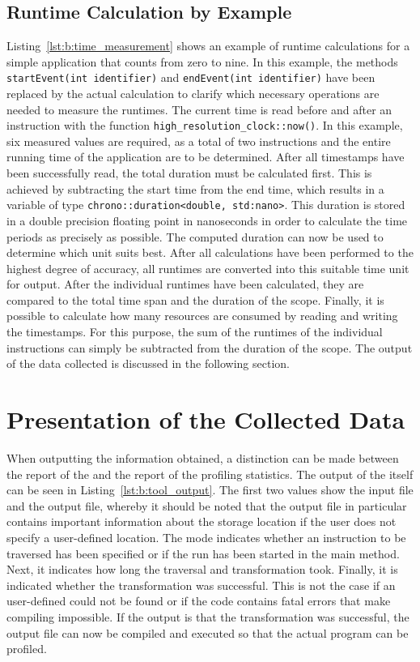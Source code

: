 \subsection{Runtime Calculation by Example}
Listing~\ref{lst:b:time_measurement} shows an example of runtime calculations for a simple application that counts from zero to nine. In this example, the methods \lstinline{startEvent(int identifier)} and \lstinline{endEvent(int identifier)} have been replaced by the actual calculation to clarify which necessary operations are needed to measure the runtimes. The current time is read before and after an instruction with the function \lstinline{high_resolution_clock::now()}. In this example, six measured values are required, as a total of two instructions and the entire running time of the application are to be determined. After all timestamps have been successfully read, the total duration must be calculated first. This is achieved by subtracting the start time from the end time, which results in a variable of type \lstinline{chrono::duration<double, std:nano>}. This duration is stored in a double precision floating point in nanoseconds in order to calculate the time periods as precisely as possible. The computed duration can now be used to determine which unit suits best. After all calculations have been performed to the highest degree of accuracy, all runtimes are converted into this suitable time unit for output. After the individual runtimes have been calculated, they are compared to the total time span and the duration of the scope. Finally, it is possible to calculate how many resources are consumed by reading and writing the timestamps. For this purpose, the sum of the runtimes of the individual instructions can simply be subtracted from the duration of the scope. The output of the data collected is discussed in the following section. 

\section{Presentation of the Collected Data}
When outputting the information obtained, a distinction can be made between the report of the \TOOL and the report of the profiling statistics. The output of the \TOOL itself can be seen in Listing~\ref{lst:b:tool_output}. The first two values show the input file and the output file, whereby it should be noted that the output file in particular contains important information about the storage location if the user does not specify a user-defined location. The mode indicates whether an instruction to be traversed has been specified or if the run has been started in the main method. Next, it indicates how long the traversal and transformation took. Finally, it is indicated whether the \SOUTOSOU transformation was successful. This is not the case if an user-defined \STAT could not be found or if the code contains fatal errors that make compiling impossible. If the output is that the transformation was successful, the output file can now be compiled and executed so that the actual program can be profiled. 


